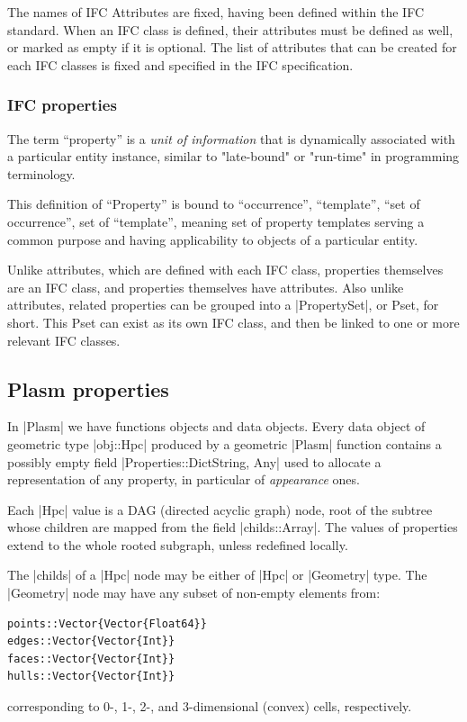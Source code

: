 \begin{coding}
The names of IFC Attributes are fixed, having been defined within the IFC standard. When an IFC class is defined, their attributes must be defined as well, or marked as empty if it is optional. The list of attributes that can be created for each IFC classes is fixed and specified in the IFC specification. 


\subsubsection*{IFC properties}\label{sect:4-4-2-2}

\begin{definition}
The term “property” is a \emph{unit of information} that is dynamically associated with a particular entity instance, similar to "late-bound" or "run-time" in programming terminology. 
\end{definition}

This definition of “Property” is bound to “occurrence”, “template”, “set of occurrence”, set of “template”, meaning set of property templates serving a common purpose and having applicability to objects of a particular entity.

Unlike attributes, which are defined with each IFC class, properties themselves are an IFC class, and properties themselves have attributes. Also unlike attributes, related properties can be grouped into a |PropertySet|, or Pset, for short. This Pset can exist as its own IFC class, and then be linked to one or more relevant IFC classes. 


\subsection*{Plasm properties}\label{sect:4-4-3}

In |Plasm| we have functions objects and data objects. Every data object of geometric type |obj::Hpc| produced by a geometric |Plasm| function contains a possibly empty field |Properties::Dict{String, Any}| used to allocate a representation of any property, in particular of \emph{appearance} ones.  

Each |Hpc| value is a DAG (directed acyclic graph) node, root of the subtree whose children are mapped from the field |childs::Array|. The values of properties extend to the whole rooted subgraph, unless redefined locally.

The |childs| of a |Hpc| node may be either of |Hpc| or |Geometry| type. The |Geometry| node may have any subset of non-empty elements from:
\begin{lstlisting}[language=JuliaLocal, style=julia, mathescape=true]
points::Vector{Vector{Float64}}
edges::Vector{Vector{Int}}
faces::Vector{Vector{Int}}
hulls::Vector{Vector{Int}}
\end{lstlisting}
corresponding to 0-, 1-, 2-, and 3-dimensional (convex) cells, respectively. 


\end{coding}
